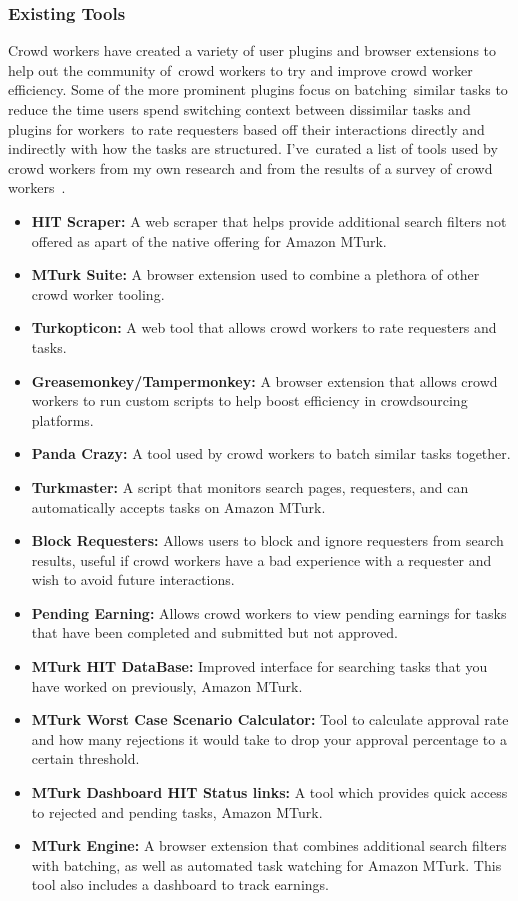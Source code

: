\documentclass[letterpaper,12pt]{article}
\begin{document}
\subsubsection{Existing Tools}
Crowd workers have created a variety of user plugins and browser extensions to help out the community of\
crowd workers to try and improve crowd worker efficiency. Some of the more prominent plugins focus on batching\
similar tasks to reduce the time users spend switching context between dissimilar tasks and plugins for workers\
to rate requesters based off their interactions directly and indirectly with how the tasks are structured. I've\
curated a list of tools used by crowd workers from my own research and from the results of a survey of crowd workers\
\cite{Kaplan2018}. 

\begin{itemize}
	\item \textbf{HIT Scraper:} A web scraper that helps provide additional search filters not offered as apart of the native offering for Amazon MTurk.
	\item \textbf{MTurk Suite:} A browser extension used to combine a plethora of other crowd worker tooling.
	\item \textbf{Turkopticon:} A web tool that allows crowd workers to rate requesters and tasks.
	\item \textbf{Greasemonkey/Tampermonkey:} A browser extension that allows crowd workers to run custom scripts to help boost efficiency in crowdsourcing platforms.
	\item \textbf{Panda Crazy:} A tool used by crowd workers to batch similar tasks together.
	\item \textbf{Turkmaster:} A script that monitors search pages, requesters, and can automatically accepts tasks on Amazon MTurk.
	\item \textbf{Block Requesters:} Allows users to block and ignore requesters from search results, useful if crowd workers have a bad experience with a requester and wish to avoid future interactions.
	\item \textbf{Pending Earning:} Allows crowd workers to view pending earnings for tasks that have been completed and submitted but not approved.
	\item \textbf{MTurk HIT DataBase:} Improved interface for searching tasks that you have worked on previously, Amazon MTurk.
	\item \textbf{MTurk Worst Case Scenario Calculator:} Tool to calculate approval rate and how many rejections it would take to drop your approval percentage to a certain threshold.
	\item \textbf{MTurk Dashboard HIT Status links:} A tool which provides quick access to rejected and pending tasks, Amazon MTurk.
	\item \textbf{MTurk Engine:} A browser extension that combines additional search filters with batching, as well as automated task watching for Amazon MTurk. This tool also includes a dashboard to track earnings.
\end{itemize}
\end{document}
